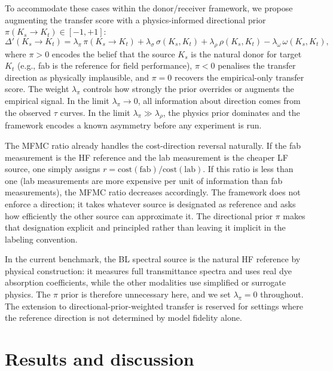 \documentclass[twoside,twocolumn,9pt]{article}
\begin{document}
To accommodate these cases within the donor/receiver framework, we propose augmenting the transfer score with a physics-informed directional prior $\pi(K_s \to K_t) \in [-1, +1]$:
\begin{equation}
\Delta'(K_s \to K_t) = \lambda_\pi \, \pi(K_s \to K_t) + \lambda_\sigma \, \sigma(K_s, K_t) + \lambda_\rho \, \rho(K_s, K_t) - \lambda_\omega \, \omega(K_s, K_t),
\label{eq:delta_prime}
\end{equation}
where $\pi > 0$ encodes the belief that the source $K_s$ is the natural donor for target $K_t$ (e.g., fab is the reference for field performance), $\pi < 0$ penalises the transfer direction as physically implausible, and $\pi = 0$ recovers the empirical-only transfer score. The weight $\lambda_\pi$ controls how strongly the prior overrides or augments the empirical signal. In the limit $\lambda_\pi \to 0$, all information about direction comes from the observed $\tau$ curves. In the limit $\lambda_\pi \gg \lambda_\rho$, the physics prior dominates and the framework encodes a known asymmetry before any experiment is run.

The MFMC ratio already handles the cost-direction reversal naturally. If the fab measurement is the HF reference and the lab measurement is the cheaper LF source, one simply assigns $r = \mathrm{cost}(\mathrm{fab}) / \mathrm{cost}(\mathrm{lab})$. If this ratio is less than one (lab measurements are more expensive per unit of information than fab measurements), the MFMC ratio decreases accordingly. The framework does not enforce a direction; it takes whatever source is designated as reference and asks how efficiently the other source can approximate it. The directional prior $\pi$ makes that designation explicit and principled rather than leaving it implicit in the labeling convention.

In the current benchmark, the BL spectral source is the natural HF reference by physical construction: it measures full transmittance spectra and uses real dye absorption coefficients, while the other modalities use simplified or surrogate physics. The $\pi$ prior is therefore unnecessary here, and we set $\lambda_\pi = 0$ throughout. The extension to directional-prior-weighted transfer is reserved for settings where the reference direction is not determined by model fidelity alone.

\section{Results and discussion}
\end{document}
